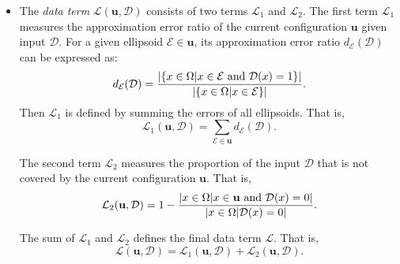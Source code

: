 \documentclass[journal]{IEEEtran}
\begin{document}
\begin{itemize}
\item The \textit{data term} $\mathcal{L}(\mathbf{u}, \mathcal{D})$
  consists of two terms $\mathcal{L}_1$ and $\mathcal{L}_2$. The first
  term $\mathcal{L}_1$ measures the approximation error ratio of the
  current configuration $\mathbf{u}$ given input $\mathcal{D}$. For a
  given ellipsoid $\mathcal{E} \in \mathbf{u}$, its approximation
  error ratio $d_{\mathcal{E}}(\mathcal{D})$ can be expressed as:
  \begin{equation}
    \label{eq:data-term1-single}
    d_{\mathcal{E}}(\mathcal{D}) = \frac{ | \{ x \in \Omega | x \in
      \mathcal{E} \textnormal{ and } \mathcal{D}(x) = 1\} | } { |\{ x
      \in \Omega | x \in \mathcal{E} \}| }.
  \end{equation}
  Then $\mathcal{L}_1$ is defined by summing the errors of all
  ellipsoids. That is,
  \begin{equation}
    \label{eq:data-term1}
    \mathcal{L}_{1}(\mathbf{u}, \mathcal{D}) = \sum_{\mathcal{E} \in
      \mathbf{u}} d_{\mathcal{E}} (\mathcal{D}).
  \end{equation}

  The second term $\mathcal{L}_2$ measures the proportion of the input
  $\mathcal{D}$ that is not covered by the current configuration
  $\mathbf{u}$. That is,
  \begin{equation}
    \label{eq:data-term2}
    \mathcal{L}_{2}(\mathbf{u}, \mathcal{D}) = 1 -
    \frac{|x \in \Omega| x \in \mathbf{u} \textnormal{ and }
      \mathcal{D}(x) = 0|} {|x \in \Omega| \mathcal{D}(x) = 0|}.
  \end{equation}

  The sum of $\mathcal{L}_1$ and $\mathcal{L}_2$ defines the final
  data term $\mathcal{L}$. That is,
  \begin{equation}
    \label{eq:data-term-final}
    \mathcal{L}(\mathbf{u}, \mathcal{D}) = \mathcal{L}_{1}(\mathbf{u},
    \mathcal{D}) + \mathcal{L}_{2}(\mathbf{u}, \mathcal{D}).
  \end{equation}


\end{itemize}
\end{document}
